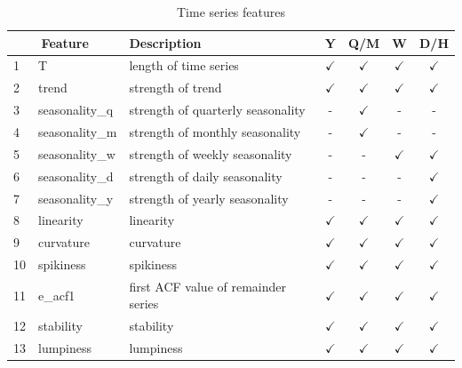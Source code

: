 \documentclass[11pt,a4paper,]{article}
\def\yes{$\checkmark$}
\begin{document}
\begin{table}[!htp]
\centering\footnotesize\tabcolsep=0.12cm
\caption{Time series features}
\label{feature}
\begin{tabular}{llp{}cccc}
\toprule
\multicolumn{2}{c}{Feature} & Description & Y & Q/M & W & D/H\\
\midrule
1  & T              & length of time series                                                                   & \yes  & \yes & \yes & \yes\\
2  & trend          & strength of trend                                                                       & \yes  & \yes & \yes & \yes\\
3  & seasonality\_q    & strength of quarterly seasonality                                                    & -     & \yes & - & -\\
4  & seasonality\_m    & strength of monthly seasonality                                                      & -     & \yes & - & -\\
5  & seasonality\_w    & strength of weekly seasonality                                                       & -     & - & \yes & \yes \\
6  & seasonality\_d    & strength of daily seasonality                                                        & -     & - & - & \yes\\
7  & seasonality\_y    & strength of yearly seasonality                                                       & -     & - & - & \yes\\
8  & linearity      & linearity                                                                               & \yes  & \yes & \yes & \yes\\
9  & curvature      & curvature                                                                               & \yes  & \yes & \yes & \yes\\
10  & spikiness      & spikiness                                                                               & \yes  & \yes & \yes & \yes\\
11  & e\_acf1        & first ACF value of remainder series                                                     & \yes  & \yes & \yes & \yes\\
12  & stability      & stability                                                                               & \yes  & \yes & \yes & \yes\\
13  & lumpiness      & lumpiness                                                                               & \yes  & \yes & \yes & \yes\\

\end{tabular}
\end{table}
\end{document}
